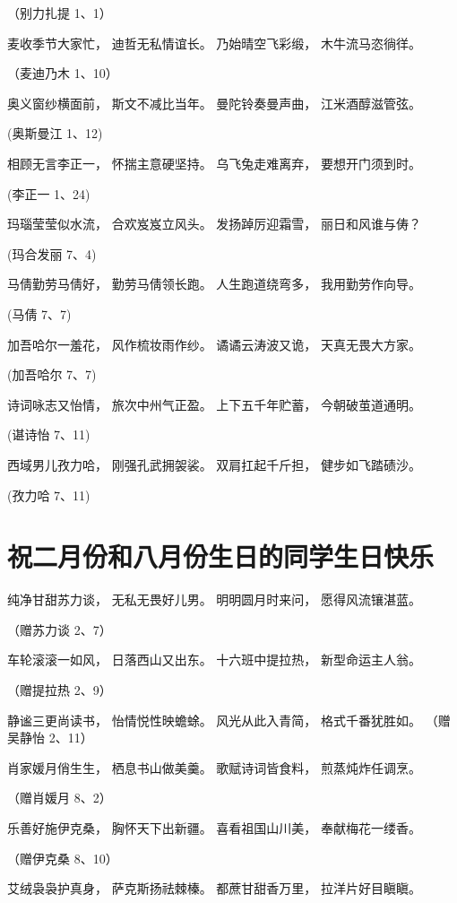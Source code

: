 \documentclass[openany]{ctexbook}
\begin{document}
（别力扎提 1、1）

麦收季节大家忙， 迪哲无私情谊长。 乃始晴空飞彩缎， 木牛流马恣徜徉。

（麦迪乃木 1、10）

奥义窗纱横面前， 斯文不减比当年。 曼陀铃奏曼声曲， 江米酒醇滋管弦。

(奥斯曼江 1、12)

相顾无言李正一， 怀揣主意硬坚持。 乌飞兔走难离弃， 要想开门须到时。

(李正一 1、24)

玛瑙莹莹似水流， 合欢岌岌立风头。 发扬踔厉迎霜雪， 丽日和风谁与俦？

(玛合发丽 7、4)

马倩勤劳马倩好， 勤劳马倩领长跑。 人生跑道绕弯多， 我用勤劳作向导。

(马倩 7、7)

加吾哈尔一羞花， 风作梳妆雨作纱。 谲谲云涛波又诡， 天真无畏大方家。

(加吾哈尔 7、7)

诗词咏志又怡情， 旅次中州气正盈。 上下五千年贮蓄， 今朝破茧道通明。

(谌诗怡 7、11)

西域男儿孜力哈， 刚强孔武拥袈裟。 双肩扛起千斤担， 健步如飞踏碛沙。

(孜力哈 7、11)

\chapter*{祝二月份和八月份生日的同学生日快乐}\label{birthday2}

纯净甘甜苏力谈， 无私无畏好儿男。 明明圆月时来问， 愿得风流镶湛蓝。

（赠苏力谈 2、7）

车轮滚滚一如风， 日落西山又出东。 十六班中提拉热， 新型命运主人翁。

（赠提拉热 2、9）

静谧三更尚读书， 怡情悦性映蟾蜍。 风光从此入青简， 格式千番犹胜如。
（赠吴静怡 2、11）

肖家媛月俏生生， 栖息书山做美羹。 歌赋诗词皆食料， 煎蒸炖炸任调烹。

（赠肖媛月 8、2）

乐善好施伊克桑， 胸怀天下出新疆。 喜看祖国山川美， 奉献梅花一缕香。

（赠伊克桑 8、10）

艾绒袅袅护真身， 萨克斯扬祛棘榛。 都蔗甘甜香万里， 拉洋片好目瞋瞋。
\end{document}
